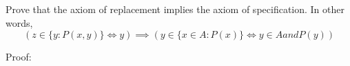 
\addtocounter{subsection}{10}
\subsection{}

Prove that the axiom of replacement implies the axiom of specification. In other words,
\begin{equation}
    (
        z \in \{  y:P(x,y) \} 
        \iff
        y 
    )
    \implies
    (
        y \in \{ x \in A : P(x) \}
        \iff
        y \in A and P(y)
    )  
\end{equation}

Proof: 

